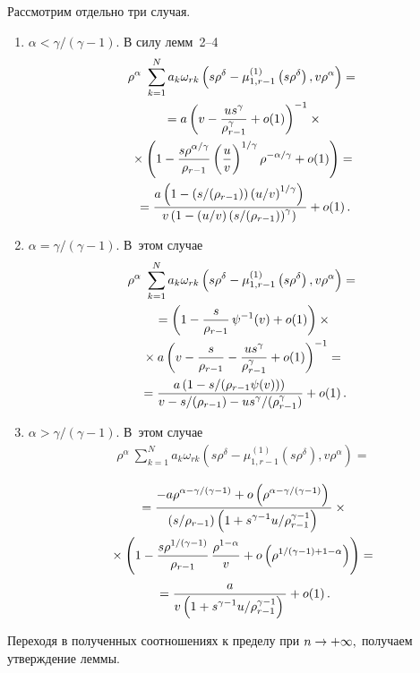 \begin{multicols}{2}
Рассмотрим отдельно три случая.
\begin{enumerate}[1.]
\item $\alpha<{\gamma}/({\gamma-1}).$ В силу лемм~2--4
\begin{multline*}
\rho^{\alpha}\ \sum\limits_{k=1}^N a_k\omega_{rk}\left(s\rho^{\delta}-\mu_{1,r-1}^{(1)}\left(
s\rho^{\delta}\right),v\rho^{\alpha}\right)={}\\
{}=a\left(v-\displaystyle\frac{\displaystyle us^{\gamma}\mathstrut}{\displaystyle \rho_{r-1}^{\gamma}\mathstrut}+
o(1)\right)^{-1}\times{}\\
{}\times
\left(1-\displaystyle\frac{\displaystyle s\rho^{{\alpha}/{\gamma}}\mathstrut}{\displaystyle \rho_{r-1}\mathstrut}\left(\displaystyle\frac{\displaystyle u\mathstrut}{\displaystyle v\mathstrut}\right)^{{1}/{\gamma}}
\rho^{-{\alpha}/{\gamma}}+o(1)\right)={}\\
{}=\displaystyle\frac{\displaystyle a\left(1-({s}/({\rho_{r-1}}))
\left({u}/{v}\right)^{{1}/{\gamma}}\right)\mathstrut}{\displaystyle v\left(1-({u}/{v})\left({s}/({\rho_{r-1}})\right)^{\gamma}\right)\mathstrut}
+o(1)\,.
\end{multline*}

\item $\alpha={\gamma}/({\gamma-1}).$ В~этом случае
\begin{multline*}
\rho^{\alpha}\ \sum\limits_{k=1}^N a_k\omega_{rk}\left(s\rho^{\delta}-\mu_{1,r-1}^{(1)}
\left(s\rho^{\delta}\right),v\rho^{\alpha}\right)={}\\
{}=
\left(1-\displaystyle\frac{\displaystyle s\mathstrut}{\displaystyle \rho_{r-1}\mathstrut}\,\psi^{-1}(v)+o(1)\right)\times{}
\\
{}\times a\left(v-\displaystyle\frac{\displaystyle s\mathstrut}{\displaystyle \rho_{r-1}\mathstrut}-\displaystyle\frac{\displaystyle us^{\gamma}\mathstrut}{\displaystyle \rho_{r-1}^{\gamma}\mathstrut}+o(1)\right)^{-1}={}\\
{}=
\displaystyle\frac{\displaystyle a\left(1-{s}/({\rho_{r-1}\psi(v)})\right)\mathstrut}{\displaystyle v-{s}/({\rho_{r-1}})-
{us^{\gamma}}/({\rho_{r-1}^{\gamma}})\mathstrut}+o(1)\,.
\end{multline*}

\item $\alpha>{\gamma}/({\gamma-1}).$ В~этом случае
\begin{multline*}
\rho^{\alpha}\ \sum\limits_{k=1}^N a_k\omega_{rk}\left(s\rho^{\delta}-\mu_{1,r-1}^{(1)}\left(s
\rho^{\delta}\right),v\rho^{\alpha}\right)={}
\end{multline*}

\noindent
\begin{multline*}
{}=
\displaystyle\frac{\displaystyle -a\rho^{\alpha-{\gamma}/({\gamma-1})}+o\left(\rho^{\alpha-{\gamma}/({\gamma-1})}\right)\mathstrut}{\displaystyle ({s}/{\rho_{r-1}})
\left(1+{s^{\gamma-1}u}/{\rho_{r-1}^{\gamma-1}}\right)\mathstrut}
\times{}\\
{}\times\left(1-\displaystyle\frac{\displaystyle s\rho^{{1}/({\gamma-1})}\mathstrut}{\displaystyle \rho_{r-1}\mathstrut}\,\displaystyle\frac{\displaystyle \rho^{1-\alpha}\mathstrut}{\displaystyle v\mathstrut}+
o\left(\rho^{{1}/({\gamma-1})+1-\alpha}\right)\right)={}\\
{}=
\displaystyle\frac{\displaystyle a\mathstrut}{\displaystyle v\left(1+{s^{\gamma-1}u}/{\rho_{r-1}^{\gamma-1}}\right)\mathstrut}+o(1)\,.
\end{multline*}
\end{enumerate}
Переходя в полученных соотношениях к пределу при $n\hm\rightarrow+\infty,$ 
получаем утверждение леммы.


\end{multicols}
